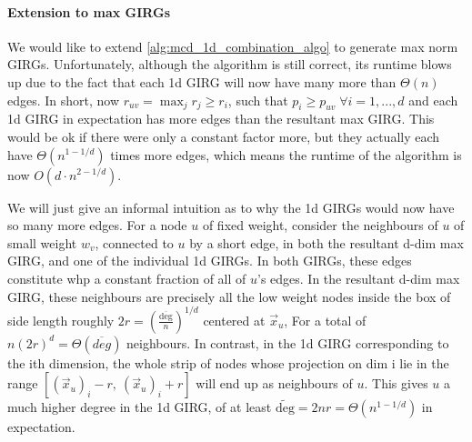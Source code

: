 \paragraph{Extension to max GIRGs} We would like to extend \cref{alg:mcd_1d_combination_algo} to generate max norm GIRGs. Unfortunately, although the algorithm is still correct, its runtime blows up due to the fact that each 1d GIRG will now have many more than $\Theta(n)$ edges. In short, now $r_{uv} = \max_j r_j \geq r_i$, such that $p_i \geq p_{uv}\; \forall i=1,...,d$ and each 1d GIRG in expectation has more edges than the resultant max GIRG. This would be ok if there were only a constant factor more, but they actually each have $\Theta(n^{1 - 1/d})$ times more edges, which means the runtime of the algorithm is now $O(d \cdot n^{2 - 1/d})$.


We will just give an informal intuition as to why the 1d GIRGs would now have so many more edges.
For a node $u$ of fixed weight, consider the neighbours of $u$ of small weight $w_v$, connected to $u$ by a short edge, in both the resultant d-dim max GIRG, and one of the individual 1d GIRGs.
In both GIRGs, these edges constitute whp a constant fraction of all of $u$'s edges.
In the resultant d-dim max GIRG, these neighbours are precisely all the low weight nodes inside the box of side length roughly $2r = \left ( \frac{\overline{\text{deg}}}{ n} \right )^{1/d}$ centered at $\vec{x}_u$, For a total of $n (2r)^d = \Theta(\overline{deg})$ neighbours.
In contrast, in the 1d GIRG corresponding to the ith dimension, the whole strip of nodes whose projection on dim i lie in the range $[(\vec{x}_u)_i - r,\: (\vec{x}_u)_i +r]$ will end up as neighbours of $u$.
This gives $u$ a much higher degree in the 1d GIRG, of at least $\widetilde{\text{deg}} = 2nr = \Theta(n^{1 - 1/d})$ in expectation.




